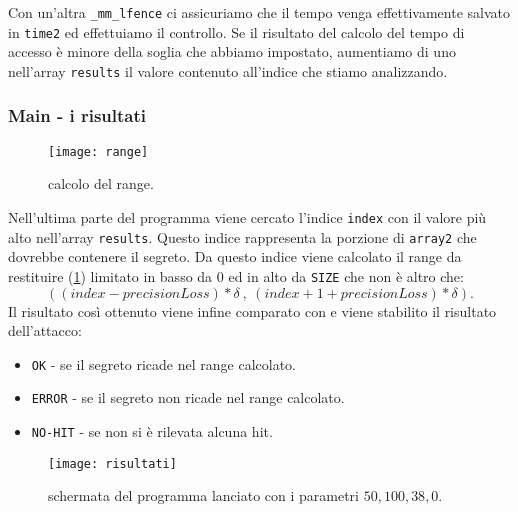 				Con un'altra \texttt{\_mm\_lfence} ci assicuriamo che il tempo venga effettivamente salvato in \texttt{time2} ed effettuiamo il controllo. Se il risultato del calcolo del tempo di accesso è minore della soglia che abbiamo impostato, aumentiamo di uno nell'array \texttt{results} il valore  contenuto all'indice che stiamo analizzando.
				
				\subsubsection{Main - i risultati}
				
				\begin{figure}[b]
					\begin{center}
						\texttt{[image: range]}
						\caption[Schermata di SPARK]{calcolo del range.}
						\label{fig:range}
					\end{center}
				\end{figure}
				
				Nell'ultima parte del programma viene cercato l'indice \texttt{index} con il valore più alto nell'array \texttt{results}. Questo indice rappresenta la porzione di \texttt{array2} che dovrebbe contenere il segreto. Da questo indice viene calcolato il range da restituire (\cref{fig:range}) limitato in basso da $0$ ed in alto da \texttt{SIZE} che non è altro che: $$((index - precisionLoss) * \delta\ ,\ (index + 1 + precisionLoss) * \delta).$$ Il risultato così ottenuto viene infine comparato con  e viene stabilito il risultato dell'attacco:
				
				\begin{itemize}
					\item \texttt{OK} - se il segreto ricade nel range calcolato.
					\item \texttt{ERROR} - se il segreto non ricade nel range calcolato.
					\item \texttt{NO-HIT} - se non si è rilevata alcuna hit.
				\end{itemize}
			
				\begin{figure}
					\begin{center}
						\texttt{[image: risultati]}
						\caption[schermata di SPARK]{schermata del programma lanciato con i parametri $50,100,38,0$.}
						\label{fig:schermata}
					\end{center}
				\end{figure}
				
